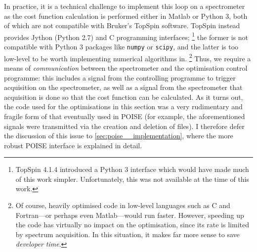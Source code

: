 In practice, it is a technical challenge to implement this loop on a spectrometer as the cost function calculation is performed either in Matlab or Python 3, both of which are not compatible with Bruker's TopSpin software.
TopSpin instead provides Jython (Python 2.7) and C programming interfaces;%
\footnote{TopSpin 4.1.4 introduced a Python 3 interface which would have made much of this work simpler. Unfortunately, this was not available at the time of this work.}
the former is not compatible with Python 3 packages like \texttt{numpy} or \texttt{scipy}, and the latter is too low-level to be worth implementing numerical algorithms in.%
\footnote{Of course, heavily optimised code in low-level languages such as C and Fortran---or perhaps even Matlab---would run faster. However, speeding up the code has virtually no impact on the optimisation, since its rate is limited by spectrum acquisition. In this situation, it makes far more sense to save \textit{developer time}.}
Thus, we require a means of \textit{communication} between the spectrometer and the optimisation control programme: this includes a signal from the controlling programme to trigger acquisition on the spectrometer, as well as a signal from the spectrometer that acquisition is done so that the cost function can be calculated.
As it turns out, the code used for the optimisations in this section was a very rudimentary and fragile form of that eventually used in POISE (for example, the aforementioned signals were transmitted via the creation and deletion of files).
I therefore defer the discussion of this issue to \cref{sec:poise__implementation}, where the more robust POISE interface is explained in detail.
